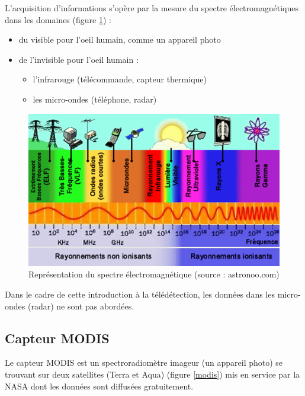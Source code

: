 \documentclass[10pt,a4paper]{article}
\begin{document}
L'acquisition d'informations s'opère par la mesure du spectre électromagnétiques dans les domaines (figure \ref{spectreElectro}) :

\begin{itemize}
\item du visible pour l'oeil humain, comme un appareil photo
\item de l'invisible pour l'oeil humain :
\begin{itemize}
\item l'infrarouge (télécommande, capteur thermique)
\item les micro-ondes (téléphone, radar)
\end{itemize}
\end{itemize}

\begin{figure}[!h]
\centering
\includegraphics[scale=0.6]{img/spectre-electromagnetique.png}
\caption{Représentation du spectre électromagnétique (source : astronoo.com)}
\label{spectreElectro}
\end{figure}

Dans le cadre de cette introduction à la télédétection, les données dans les micro-ondes (radar) ne sont pas abordées.

\subsection{Capteur MODIS}

Le capteur MODIS est un spectroradiomètre imageur (un appareil photo) se trouvant sur deux satellites (Terra et Aqua) (figure \ref{modis}) mis en service par la NASA dont les données sont diffusées gratuitement.
\end{document}
